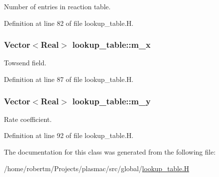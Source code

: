 Number of entries in reaction table. 



Definition at line 82 of file lookup\+\_\+table.\+H.

\subsubsection[{\texorpdfstring{m\+\_\+x}{m_x}}]{\setlength{\rightskip}{0pt plus 5cm}Vector$<$Real$>$ lookup\+\_\+table\+::m\+\_\+x\hspace{0.3cm}{\ttfamily [protected]}}\hypertarget{classlookup__table_a34979719a0df9629e975a2f3cb77ee41}{}\label{classlookup__table_a34979719a0df9629e975a2f3cb77ee41}


Towsend field. 



Definition at line 87 of file lookup\+\_\+table.\+H.

\subsubsection[{\texorpdfstring{m\+\_\+y}{m_y}}]{\setlength{\rightskip}{0pt plus 5cm}Vector$<$Real$>$ lookup\+\_\+table\+::m\+\_\+y\hspace{0.3cm}{\ttfamily [protected]}}\hypertarget{classlookup__table_a06214a7af654ac56bf94d51d685c961f}{}\label{classlookup__table_a06214a7af654ac56bf94d51d685c961f}


Rate coefficient. 



Definition at line 92 of file lookup\+\_\+table.\+H.



The documentation for this class was generated from the following file\+:\begin{DoxyCompactItemize}
\item 
/home/robertm/\+Projects/plasmac/src/global/\hyperlink{lookup__table_8H}{lookup\+\_\+table.\+H}\end{DoxyCompactItemize}
